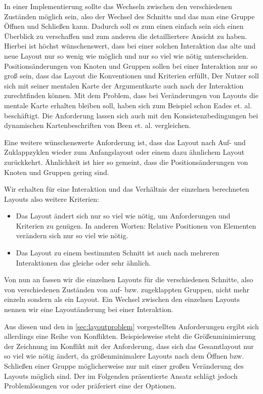 In einer Implementierung sollte das Wechseln zwischen den verschiedenen Zuständen möglich sein, also der Wechsel des Schnitts und das man eine Gruppe Öffnen und Schließen kann. 
Dadurch soll es zum einen einfach sein sich einen Überblick zu verschaffen und zum anderen die detailliertere Ansicht zu haben.
Hierbei ist höchst wünschenswert, dass bei einer solchen Interaktion das alte und neue Layout nur so wenig wie möglich und nur so viel wie nötig unterscheiden. 
Positionsänderungen von Knoten und Gruppen sollen bei einer Interaktion nur so groß sein, dass das Layout die Konventionen und Kriterien erfüllt,
Der Nutzer soll sich mit seiner mentalen Karte der Argumentkarte auch nach der Interaktion zurechtfinden können. 
Mit dem Problem, dass bei Veränderungen von Layouts die mentale Karte erhalten bleiben soll, haben sich zum Beispiel schon Eades et. al. \cite{eades1991preserving, Misue1995183}
beschäftigt. Die Anforderung lassen sich auch mit den Konsistenzbedingungen bei dynamischen Kartenbeschriften von  Been et. al. \cite{Been2010312} vergleichen.

Eine weitere wünschenswerte Anforderung ist, dass das Layout nach  Auf- und Zuklappzyklen 
wieder zum Anfangslayout oder einem dazu ähnlichem Layout zurückkehrt. 
Ähnlichkeit ist hier so gemeint, dass die Positionsänderungen von Knoten und Gruppen gering sind.

Wir erhalten für eine Interaktion und das Verhältnis der einzelnen berechneten Layouts also weitere Kriterien:
\begin{itemize}
\item Das Layout ändert sich nur so viel wie nötig, um Anforderungen und Kriterien zu genügen. In anderen Worten: Relative Positionen von Elementen verändern sich nur so viel wie nötig.
\item Das Layout zu einem bestimmten Schnitt ist auch nach mehreren Interaktionen das gleiche oder sehr ähnlich.
\end{itemize}

Von nun an fassen wir die einzelnen Layouts für die verschiedenen Schnitte, also von verschiedenen Zuständen von auf- bzw. zugeklappten Gruppen, nicht mehr einzeln
sondern als ein Layout. Ein Wechsel zwischen den einzelnen Layouts nennen wir eine Layoutänderung bei einer Interaktion.

Aus diesen und den in \autoref{sec:layoutproblem} vorgestellten Anforderungen ergibt sich allerdings eine Reihe von Konflikten.
Beispielsweise steht die Größenminimierung der Zeichnung im Konflikt mit der Anforderung, dass sich das Gesamtlayout nur so viel wie nötig ändert, 
da größenminimalere Layouts nach dem Öffnen bzw. Schließen einer Gruppe möglicherweise nur mit einer großen Veränderung des Layouts möglich sind.
Der im Folgenden präsentierte Ansatz schlägt jedoch Problemlösungen vor oder präferiert eine der Optionen.

